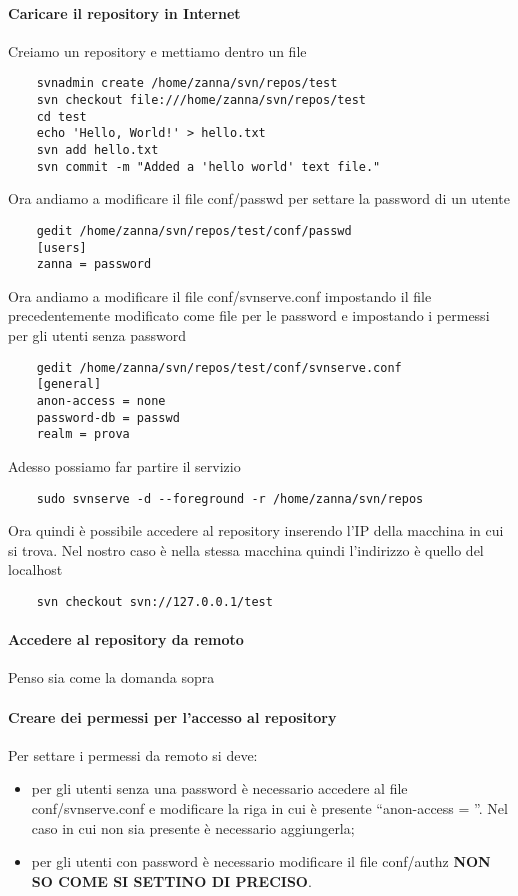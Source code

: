 \documentclass[a4paper]{article}
\begin{document}
	\paragraph{Caricare il repository in Internet}
	Creiamo un repository e mettiamo dentro un file
	\begin{verbatim}
	svnadmin create /home/zanna/svn/repos/test
	svn checkout file:///home/zanna/svn/repos/test
	cd test
	echo 'Hello, World!' > hello.txt
	svn add hello.txt
	svn commit -m "Added a 'hello world' text file."
	\end{verbatim}
	Ora andiamo a modificare il file conf/passwd per settare la password di un utente
	\begin{verbatim}
	gedit /home/zanna/svn/repos/test/conf/passwd
	[users] 
	zanna = password
	\end{verbatim}
	Ora andiamo a modificare il file conf/svnserve.conf impostando il file precedentemente modificato come file per le password e impostando i permessi per gli utenti senza password
	\begin{verbatim}
	gedit /home/zanna/svn/repos/test/conf/svnserve.conf
	[general] 
	anon-access = none 
	password-db = passwd 
	realm = prova
	\end{verbatim}
	Adesso possiamo far partire il servizio
	\begin{verbatim}
	sudo svnserve -d --foreground -r /home/zanna/svn/repos
	\end{verbatim}
	Ora quindi è possibile accedere al repository inserendo l'IP della macchina in cui si trova. Nel  nostro caso è nella stessa macchina quindi l'indirizzo è quello del localhost
	\begin{verbatim}
	svn checkout svn://127.0.0.1/test
	\end{verbatim}
	
	\paragraph{Accedere al repository da remoto}
	Penso sia come la domanda sopra
	
	\paragraph{Creare dei permessi per l'accesso al repository}
	Per settare i permessi da remoto si deve:
	\begin{itemize}
		\item per gli utenti senza una password è necessario accedere al file conf/svnserve.conf e modificare la riga in cui è presente ``anon-access = ''. Nel caso in cui non sia presente è necessario aggiungerla;
		\item per gli utenti con password è necessario modificare il file conf/authz \textbf{NON SO COME SI SETTINO DI PRECISO}.
	\end{itemize}
\end{document}
